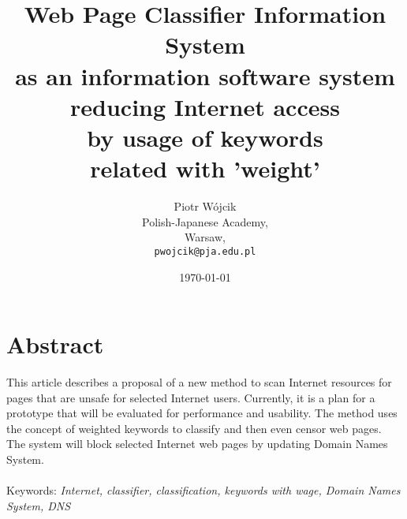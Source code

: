 \documentclass[9pt,a4paper]{extarticle}
\title{Web Page Classifier Information System\\ as an information software system\\ reducing Internet access\\ by usage of keywords\\ related with 'weight'}
\author{Piotr W\'{o}jcik\\
    Polish-Japanese Academy,\\
    Warsaw,\\
    \texttt{pwojcik@pja.edu.pl}
}
\date{\today}
\begin{document}
\maketitle


\section{Abstract}
This article describes a proposal of a new method to scan Internet resources for pages that are unsafe for selected Internet users. 
Currently, it is a plan for a prototype that will be evaluated for performance and usability. 
The method uses the concept of weighted keywords to classify and then even censor web pages.
The system will block selected Internet web pages by updating Domain Names System.\\
\\
Keywords: \textit{Internet, classifier, classification, keywords with wage, Domain Names System, DNS}
\end{document}
